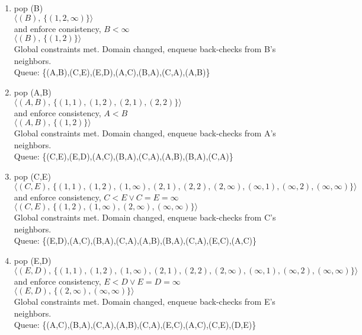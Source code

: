\documentclass[fleqn]{hermans-hw}
\begin{document}
\begin{enumerate}
\begin{enumerate}
	\item pop (B) \\
	$\langle(B), \, \lbrace (1,2,\infty) \rbrace \rangle$\\
	and enforce consistency, $B < \infty$ \\
	$\langle(B), \, \lbrace (1,2) \rbrace \rangle$\\
	Global constraints met. Domain changed, enqueue back-checks from B's neighbors.\\
	Queue: \{(A,B),(C,E),(E,D),(A,C),(B,A),(C,A),(A,B)\}\\
	
	
	\item pop (A,B) \\
	$\langle(A,B), \, \lbrace (1,1),(1,2),(2,1),(2,2) \rbrace \rangle$\\
	and enforce consistency, $A < B$ \\
	$\langle(A,B), \, \lbrace (1,2) \rbrace \rangle$\\
	Global constraints met. Domain changed, enqueue back-checks from A's neighbors.\\
	Queue: \{(C,E),(E,D),(A,C),(B,A),(C,A),(A,B),(B,A),(C,A)\}\\
	
	\pagebreak
	
	\item pop (C,E)\\
	$\langle(C,E), \, \lbrace (1,1),(1,2),(1,\infty),(2,1),(2,2),(2,\infty),(\infty,1),(\infty,2),(\infty,\infty) \rbrace \rangle$\\
	and enforce consistency, $ C < E \vee C=E=\infty$ \\
	$\langle(C,E), \, \lbrace (1,2),(1,\infty),(2,\infty),(\infty,\infty) \rbrace \rangle$\\
	Global constraints met. Domain changed, enqueue back-checks from C's neighbors.\\
	Queue: \{(E,D),(A,C),(B,A),(C,A),(A,B),(B,A),(C,A),(E,C),(A,C)\}\\
	
	\item pop (E,D)\\
	$\langle(E,D), \, \lbrace (1,1),(1,2),(1,\infty),(2,1),(2,2),(2,\infty),(\infty,1),(\infty,2),(\infty,\infty) \rbrace \rangle$\\
	and enforce consistency, $ E < D \vee E=D=\infty$ \\
	$\langle(E,D), \, \lbrace (2,\infty),(\infty,\infty) \rbrace \rangle$\\
	Global constraints met. Domain changed, enqueue back-checks from E's neighbors.\\
	Queue: \{(A,C),(B,A),(C,A),(A,B),(C,A),(E,C),(A,C),(C,E),(D,E)\}\\
	

\end{enumerate}
\end{enumerate}
\end{document}
